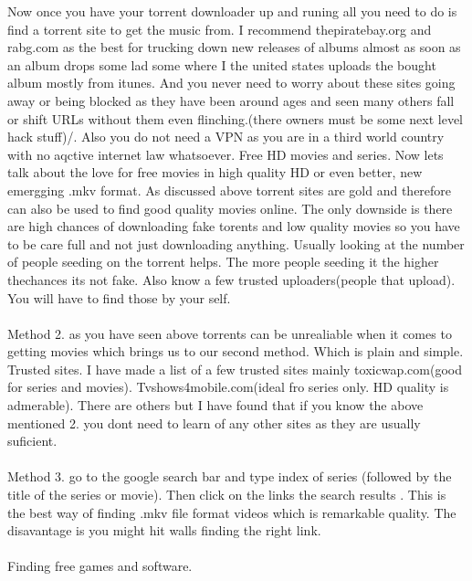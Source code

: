 \documentclass[11pt]{article}
\begin{document}
	Now once you have your torrent downloader up and runing all you need to do is find a torrent site to get the music from.
	I recommend thepiratebay.org and rabg.com as the best for trucking down new releases of albums almost as soon as an album drops some lad some where I  the united states uploads the bought album mostly from itunes.
	And you never need to worry about these sites going away or being blocked as they have been around ages and seen many others fall or shift URLs without them even flinching.(there owners must be some next level hack stuff)/.
	Also you do not need a VPN as you are in a third world country with no aqctive internet law whatsoever.
	Free HD movies and series.
	Now lets talk about the love for free movies in high quality HD or even better, new emergging .mkv format.
	As discussed above torrent sites are gold and therefore can also be used to find good quality movies online.
	The only downside is there are high chances of downloading fake torents and low quality movies so you have to be care full and not just downloading anything.
	Usually looking at the number of people seeding on the torrent helps.
	The more people seeding it the higher thechances its not fake.
	Also know a few trusted uploaders(people that upload).
	You will have to find those by your self.
	\paragraph{}
	Method 2.
	as you have seen above torrents can be unrealiable when it comes to getting movies which brings us to our second method.
	Which is plain and simple. Trusted sites.
	I have made a list of a few trusted sites mainly
	toxicwap.com(good for series and movies).
	Tvshows4mobile.com(ideal fro series only. HD quality is admerable).
	There are others but I have found that if you know the above mentioned 2.
	you dont need to learn of any other sites as they are usually suficient.
	\paragraph{}
	Method 3.
	go to the google search bar and type index of series (followed by the title of the series or movie).
	Then click on the links the search results .
	This is the best way of finding .mkv file format videos which is remarkable quality.
	The disavantage is you might hit walls finding the right link.
	\paragraph{}
	Finding free games and software.
\end{document}
